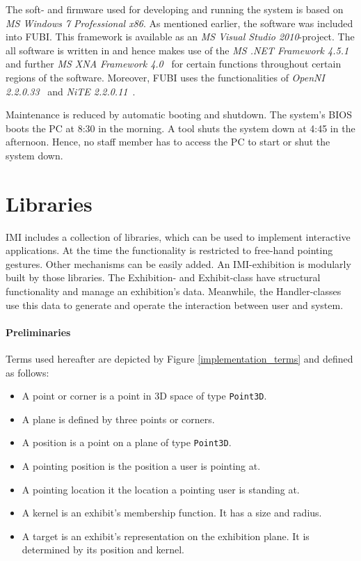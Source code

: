 The soft- and firmware used for developing and running the system is based on \textit{\ac{MS} Windows 7 Professional x86}. As mentioned earlier, the software was included into \ac{FUBI}. This framework is available as an \textit{\ac{MS} Visual Studio 2010}-project. The all software is written in  and hence makes use of the \textit{\ac{MS} .NET Framework 4.5.1}~\cite{MSNET} and further \textit{\ac{MS} XNA Framework 4.0}~\cite{MSXNA} for certain functions throughout certain regions of the software. Moreover, \ac{FUBI} uses the functionalities of \textit{OpenNI 2.2.0.33}~\cite{OpenNI} and \textit{NiTE 2.2.0.11}~\cite{NiTE}.

Maintenance is reduced by automatic booting and shutdown. The system's BIOS boots the PC at 8:30 in the morning. A tool shuts the system down at 4:45 in the afternoon. Hence, no staff member has to access the PC to start or shut the system down.


\section{Libraries}
\label{implementation_libraries}

\ac{IMI} includes a collection of libraries, which can be used to implement interactive applications. At the time the functionality is restricted to free-hand pointing gestures. Other mechanisms can be easily added. An \ac{IMI}-exhibition is modularly built by those libraries. The Exhibition- and Exhibit-class have structural functionality and manage an exhibition's data. Meanwhile, the Handler-classes use this data to generate and operate the interaction between user and system.

\paragraph{Preliminaries} Terms used hereafter are depicted by Figure \ref{implementation_terms} and defined as follows:
\begin{itemize}
	\item A point or corner is a point in \ac{3D} space of type \texttt{Point3D}.
	\item A plane is defined by three points or corners. 
	\item A position is a point on a plane of type \texttt{Point3D}.
	\item A pointing position is the position a user is pointing at.
	\item A pointing location it the location a pointing user is standing at.
	\item A kernel is an exhibit's membership function. It has a size and radius.
	\item A target is an exhibit's representation on the exhibition plane. It is determined by its position and kernel.
\end{itemize}

